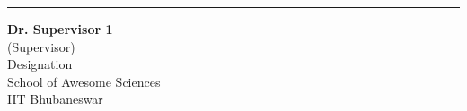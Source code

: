 \vspace*{15pt}
\begin{center}
    \begin{minipage}[t]{0.4\textwidth}
    \begin{center}
        \hrule\vspace{2ex}
        {\small {\bfseries Dr. Supervisor 1}\\
        (Supervisor)\\
        Designation\\
        School of Awesome Sciences\\
        IIT Bhubaneswar}
    \end{center}
    \end{minipage}

\end{center}

